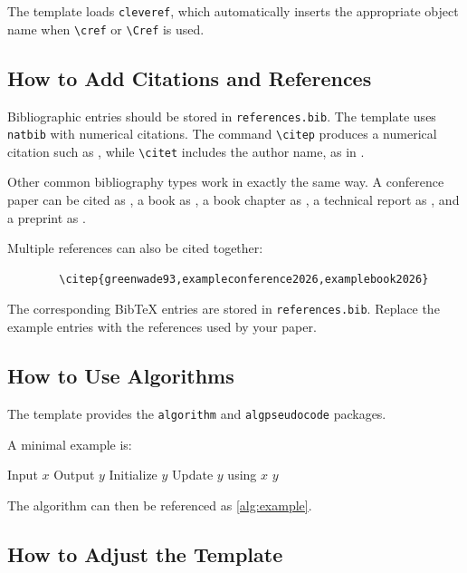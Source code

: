 \documentclass{article}
\begin{document}
	The template loads \texttt{cleveref}, which automatically inserts the appropriate object name when \verb|\cref| or \verb|\Cref| is used.
	
	
	\subsection{How to Add Citations and References}
	
	Bibliographic entries should be stored in \texttt{references.bib}. The template uses \texttt{natbib} with numerical citations. The command \verb|\citep| produces a numerical citation such as \citep{greenwade93}, while \verb|\citet| includes the author name, as in \citet{greenwade93}.
	
	Other common bibliography types work in exactly the same way. A conference paper can be cited as \citep{exampleconference2026}, a book as \citep{examplebook2026}, a book chapter as \citep{examplechapter2026}, a technical report as \citep{examplereport2026}, and a preprint as \citep{examplepreprint2026}.
	
	Multiple references can also be cited together:
	
	\begin{verbatim}
		\citep{greenwade93,exampleconference2026,examplebook2026}
	\end{verbatim}
	
	The corresponding BibTeX entries are stored in \texttt{references.bib}. Replace the example entries with the references used by your paper.
	
	
	\subsection{How to Use Algorithms}
	
	The template provides the \texttt{algorithm} and \texttt{algpseudocode} packages.
	
	A minimal example is:
	
	\begin{algorithm}[t]
		\caption{Example Algorithm}
		\label{alg:example}
		\begin{algorithmic}[1]
			\Require Input $x$
			\Ensure Output $y$
			\State Initialize $y$
			\State Update $y$ using $x$
			\State \Return $y$
		\end{algorithmic}
	\end{algorithm}
	
	The algorithm can then be referenced as \cref{alg:example}.
	
	
	\subsection{How to Adjust the Template}
	
\end{document}
